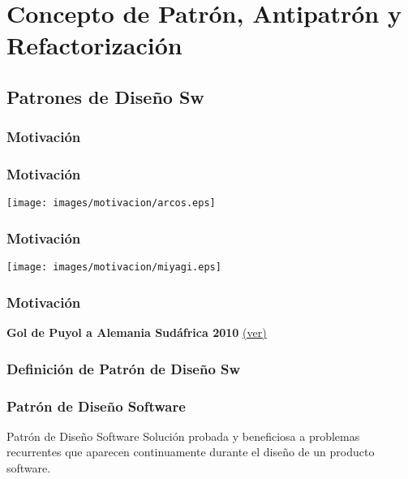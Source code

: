 ﻿\documentclass[animated,a4paper,slidestop,xcolor=pst,blue]{beamer}
\begin{document}
\section{Concepto de Patrón, Antipatrón y Refactorización}

\subsection{Patrones de Diseño Sw}

\subsubsection{Motivación}

\begin{frame}[c]
	\frametitle{Motivación}
	\begin{center}
		\texttt{[image: images/motivacion/arcos.eps]}
	\end{center}
\end{frame}

\begin{frame}[c]
	\frametitle{Motivación}
	\begin{center}
		\texttt{[image: images/motivacion/miyagi.eps]}
	\end{center}
\end{frame}

\begin{frame}[c]
	\frametitle{Motivación}
	\begin{center}
		\textbf{Gol de Puyol a Alemania Sudáfrica 2010} \href{http://www.youtube.com/watch?v=Tnt7C2L6d3M}{(ver)}
	\end{center}
\end{frame}

\subsubsection{Definición de Patrón de Diseño Sw}

\begin{frame}[c]
	\frametitle{Patrón de Diseño Software}
	\begin{block}{Patrón de Diseño Software}
		\alert<2>{Solución probada y beneficiosa} a \alert<3>{problemas recurrentes} que aparecen continuamente durante el diseño de un producto software.
	\end{block}
\end{frame}
\end{document}
